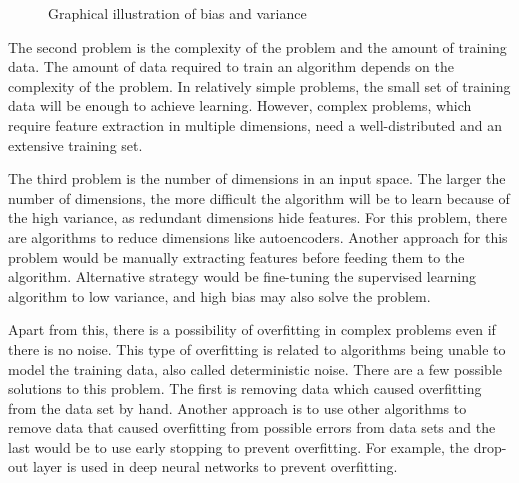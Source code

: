 \begin{figure}[htbp]
\centering
{}
\caption{Graphical illustration of bias and variance \cite{biasandvarianceillustration}}
\label{fig:BiasAndVariance}
\end{figure}

The second problem is the complexity of the problem and the amount of training data. The amount of data required to train an algorithm depends on the complexity of the problem. In relatively simple problems, the small set of training data will be enough to achieve learning. However, complex problems, which require feature extraction in multiple dimensions, need a well-distributed and an extensive training set.

The third problem is the number of dimensions in an input space. The larger the number of dimensions, the more difficult the algorithm will be to learn because of the high variance, as redundant dimensions hide features. For this problem, there are algorithms to reduce dimensions like autoencoders. Another approach for this problem would be manually extracting features before feeding them to the algorithm. Alternative strategy would be fine-tuning the supervised learning algorithm to low variance, and high bias may also solve the problem.

Apart from this, there is a possibility of overfitting in complex problems even if there is no noise. This type of overfitting is related to algorithms being unable to model the training data, also called deterministic noise. There are a few possible solutions to this problem. The first is removing data which caused overfitting from the data set by hand. Another approach is to use other algorithms to remove data that caused overfitting from possible errors from data sets and the last would be to use early stopping to prevent overfitting. For example, the drop-out layer is used in deep neural networks to prevent overfitting.

